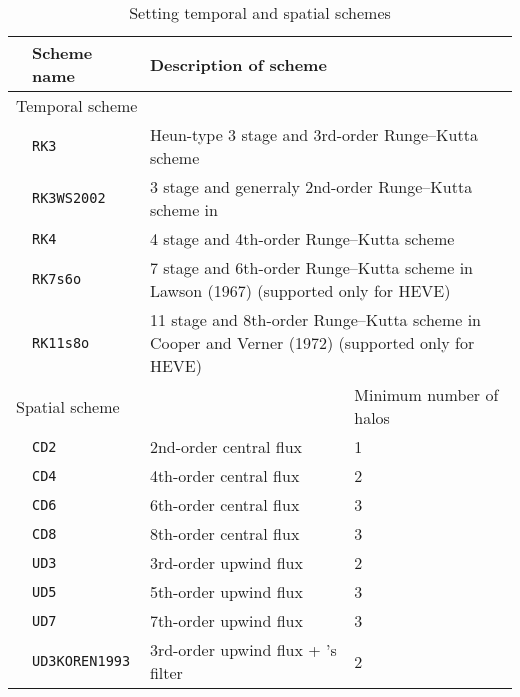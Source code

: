 \begin{table}[bth]
\begin{center}
  \caption{Setting temporal and spatial schemes}
  \label{tab:nml_atm_dyn}
  \begin{tabularx}{150mm}{lllX} \hline
    \rowcolor[gray]{0.9} & \multicolumn{1}{l}{Scheme name} & \multicolumn{1}{l}{Description of scheme} & \\ \hline
    \multicolumn{3}{l}{Temporal scheme} &  \\ \hline
    & \multicolumn{1}{l}{\verb|RK3|} & \multicolumn{2}{l}{Heun-type 3 stage and 3rd-order Runge--Kutta scheme} \\
    & \multicolumn{1}{l}{\verb|RK3WS2002|} & \multicolumn{2}{l}{3 stage and generraly 2nd-order Runge--Kutta scheme in \citet{Wicker_2002}} \\
    & \multicolumn{1}{l}{\verb|RK4|} & \multicolumn{2}{l}{4 stage and 4th-order Runge--Kutta scheme} \\
    & \multicolumn{1}{l}{\verb|RK7s6o|} & \multicolumn{2}{l}{7 stage and 6th-order Runge--Kutta scheme in Lawson (1967) (supported only for HEVE)} \\
    & \multicolumn{1}{l}{\verb|RK11s8o|} & \multicolumn{2}{l}{11 stage and 8th-order Runge--Kutta scheme in Cooper and Verner (1972) (supported only for HEVE)} \\
    \hline
    \multicolumn{3}{l}{Spatial scheme} & Minimum number of halos\\ \hline
    & \multicolumn{1}{l}{\verb|CD2|} & \multicolumn{1}{l}{2nd-order central flux} & \multicolumn{1}{l}{1}\\
    & \multicolumn{1}{l}{\verb|CD4|} & \multicolumn{1}{l}{4th-order central flux} & \multicolumn{1}{l}{2}\\
    & \multicolumn{1}{l}{\verb|CD6|} & \multicolumn{1}{l}{6th-order central flux} & \multicolumn{1}{l}{3}\\
    & \multicolumn{1}{l}{\verb|CD8|} & \multicolumn{1}{l}{8th-order central flux} & \multicolumn{1}{l}{3}\\
    & \multicolumn{1}{l}{\verb|UD3|} & \multicolumn{1}{l}{3rd-order upwind flux} & \multicolumn{1}{l}{2}\\
    & \multicolumn{1}{l}{\verb|UD5|} & \multicolumn{1}{l}{5th-order upwind flux} & \multicolumn{1}{l}{3}\\
    & \multicolumn{1}{l}{\verb|UD7|} & \multicolumn{1}{l}{7th-order upwind flux} & \multicolumn{1}{l}{3}\\
    & \multicolumn{1}{l}{\verb|UD3KOREN1993|} & \multicolumn{1}{l}{3rd-order upwind flux + \citet{Koren_1993}'s filter} & \multicolumn{1}{l}{2}\\
\hline
  \end{tabularx}
\end{center}
\end{table}

